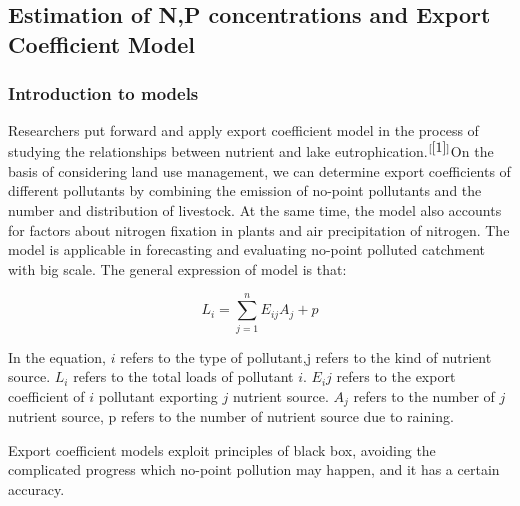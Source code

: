\documentclass[12pt,a4paper]{article}
\begin{document}
\subsection{Estimation of N,P concentrations and Export Coefficient Model}

\subsubsection{Introduction to models}
Researchers put forward and apply export coefficient model in the process of studying the relationships between nutrient and lake eutrophication.$^{[\ref{1}]}$On the basis of considering land use management, we can determine export coefficients of different pollutants by combining the emission of no-point pollutants and the number and distribution of livestock. At the same time, the model also accounts for factors about nitrogen fixation in plants and air precipitation of nitrogen. The model is applicable in forecasting and evaluating no-point polluted catchment with big scale. The general expression of model is that:

\begin{equation}L_i=\sum_{j=1}^nE_{ij}A_j+p\end{equation}

In the equation, $i$ refers to the type of pollutant,j refers to the kind of nutrient source. $L_i$ refers to the total loads of pollutant $i$. $E_ij$ refers to the export coefficient of $i$ pollutant exporting $j$ nutrient source. $A_j$ refers to the number of $j$ nutrient source, p refers to the number of nutrient source due to raining.\par

Export coefficient models exploit principles of black box, avoiding the complicated progress which no-point pollution may happen, and it has a certain accuracy. \par
\end{document}
